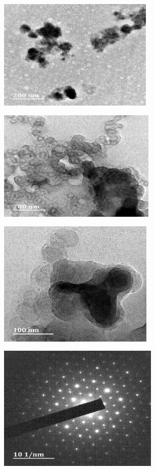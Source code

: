 \documentclass[12pt]{report}
\begin{document}
\begin{figure}[H]
\centering

\begin{subfigure}{.45\textwidth}
    \includegraphics[height=5.3cm, width=\textwidth]{diffraction_image_1.png}
\end{subfigure}
\hspace{-1em}
\begin{subfigure}{.45\textwidth}
    \includegraphics[height=5.3cm, width=\textwidth]{diffraction_image_2.png}
\end{subfigure}
\par\bigskip
\begin{subfigure}{.45\textwidth}
    \includegraphics[height=6cm, width=\textwidth]{diffraction_image_3.png}
\end{subfigure}
\hspace{-1em}
\begin{subfigure}{.45\textwidth}
    \includegraphics[height=6cm, width=\textwidth]{diffraction_image_4.png}
\end{subfigure}


\end{figure}
\end{document}
